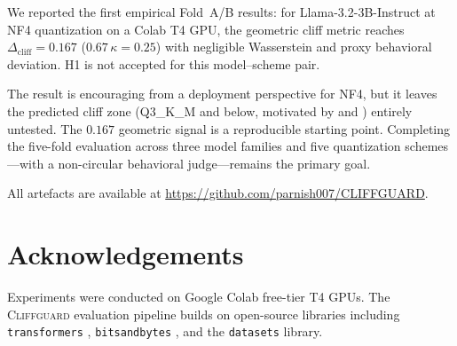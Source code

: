 \documentclass[11pt,a4paper]{article}
\newcommand{\cliff}{\Delta_{\mathrm{cliff}}}
\newcommand{\kap}{\kappa}
\newcommand{\CG}{\textsc{Cliffguard}}
\begin{document}
We reported the first empirical Fold~A/B results: for Llama-3.2-3B-Instruct at
NF4 quantization on a Colab T4 GPU, the geometric cliff metric reaches
$\cliff = 0.167$ ($0.67\,\kap = 0.25$) with negligible Wasserstein and proxy
behavioral deviation.
H1 is not accepted for this model--scheme pair.

The result is encouraging from a deployment perspective for NF4, but it leaves
the predicted cliff zone (Q3\_K\_M and below, motivated by
\citealt{egashira2024exploiting} and \citealt{mindthegap2025}) entirely untested.
The $0.167$ geometric signal is a reproducible starting point.
Completing the five-fold evaluation across three model families and five
quantization schemes---with a non-circular behavioral judge---remains the
primary goal.

All artefacts are available at \url{https://github.com/parnish007/CLIFFGUARD}.

\section*{Acknowledgements}
Experiments were conducted on Google Colab free-tier T4 GPUs.
The \CG{} evaluation pipeline builds on open-source libraries including
\texttt{transformers} \citep{meta2024llama3}, \texttt{bitsandbytes}
\citep{dettmers2023qlora}, and the \texttt{datasets} library.



\end{document}
